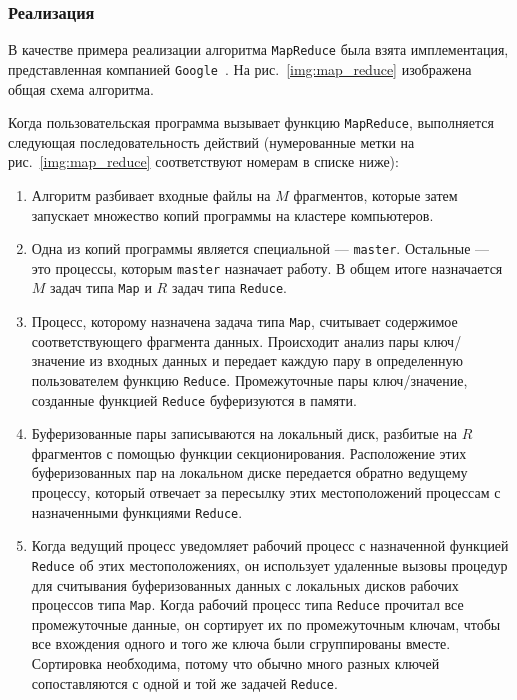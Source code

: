 \subsubsection{Реализация}
В качестве примера реализации алгоритма \texttt{MapReduce} была взята имплементация, представленная компанией \texttt{Google}~\cite{google-mapreduce}.
На рис.~\ref{img:map_reduce} изображена общая схема алгоритма.%


Когда пользовательская программа вызывает функцию \texttt{MapReduce}, выполняется следующая последовательность действий (нумерованные метки на рис.~\ref{img:map_reduce} соответствуют номерам в списке ниже):

\begin{enumerate}
  \item Алгоритм разбивает входные файлы на $M$ фрагментов, которые затем запускает множество копий программы на кластере компьютеров.
  \item Одна из копий программы является специальной --- \texttt{master}. 
    Остальные --- это процессы, которым \texttt{master} назначает работу. 
    В общем итоге назначается $M$ задач типа \texttt{Map} и $R$ задач типа \texttt{Reduce}.
  \item Процесс, которому назначена задача типа \texttt{Map}, считывает содержимое соответствующего фрагмента данных.
    Происходит анализ пары ключ/значение из входных данных и передает каждую пару в определенную пользователем функцию \texttt{Reduce}. 
    Промежуточные пары ключ/значение, созданные функцией \texttt{Reduce} буферизуются в памяти.
  \item Буферизованные пары записываются на локальный диск, разбитые на $R$ фрагментов с помощью функции секционирования.
    Расположение этих буферизованных пар на локальном диске передается обратно ведущему процессу, который отвечает за пересылку этих местоположений процессам с назначенными функциями \texttt{Reduce}.
  \item Когда ведущий процесс уведомляет рабочий процесс с назначенной функцией \texttt{Reduce} об этих местоположениях, он использует удаленные вызовы процедур для считывания буферизованных данных с локальных дисков рабочих процессов типа \texttt{Map}.
    Когда рабочий процесс типа \texttt{Reduce} прочитал все промежуточные данные, он сортирует их по промежуточным ключам, чтобы все вхождения одного и того же ключа были сгруппированы вместе. 
    Сортировка необходима, потому что обычно много разных ключей сопоставляются с одной и той же задачей \texttt{Reduce}. 

\end{enumerate}
